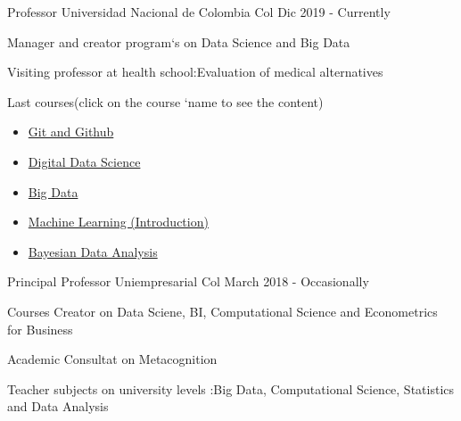 

\begin{cventries}

\cventry
    {Professor}
    {Universidad Nacional de Colombia}
    {Col}
    {Dic 2019 - Currently}
    {
    \begin{cvitems}
    \item {Manager and creator program`s on Data Science and Big Data}
    \item {Visiting professor at health school:Evaluation of medical alternatives}
    \item {Last courses(click on the course `name  to see the content)}
    \begin{itemize}
        \item {\textcolor{brown}{\href{https://github.com/carlosjimenez88M/Github-Class/tree/master}{Git and Github}}}
        \item {\textcolor{brown}{\href{https://github.com/carlosjimenez88M/Marketing_Digital}{Digital Data Science}}}
        \item {\textcolor{brown}{\href{https://github.com/carlosjimenez88M/Curso-de-Big-Data-e-Ingenieria-de-datos}{Big Data}}}
        \item {\textcolor{brown}{\href{https://github.com/carlosjimenez88M/Machine_Learning}{Machine Learning (Introduction)}}}
        \item {\textcolor{brown}{\href{https://github.com/carlosjimenez88M/Curso-de-Big-Data-e-Ingenieria-de-datos}{Bayesian Data Analysis}}}
    \end{itemize}
    \end{cvitems}
    }
 




  \cventry
    {Principal Professor } %
    {Uniempresarial} %
    {Col} %
    {March 2018 - Occasionally} %
    {
      \begin{cvitems} %
        \item {Courses Creator on Data Sciene, BI, Computational Science and Econometrics for Business}
        \item {Academic Consultat on Metacognition }
        \item {Teacher  subjects on university levels :Big Data, Computational Science, Statistics and Data Analysis}
      \end{cvitems}
    }


\end{cventries}
